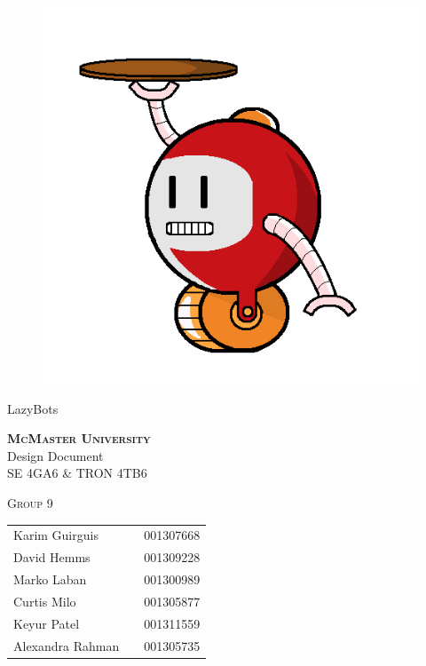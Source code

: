 \documentclass [10pt]{article}
\begin{document}
\begin {center} 

\thispagestyle{empty}
\vspace*{5cm}

\begin {figure}[h!]
\centering
\hspace{-10mm}\includegraphics [scale = .3, trim={.4cm 0 .8cm 0},clip] {figures/alfred.png}
\end {figure}

{%
\Huge{LazyBots} }

\vspace{1 cm}
{\Large\textbf{\textsc{McMaster University}}\\}  \vspace {1cm}
{\Large Design Document \\ \vspace {0.4 cm} SE 4GA6 \& TRON 4TB6}  \vspace {1cm}

{\large \textsc{Group 9} \\} \vspace{1cm}



\begin{tabular}{ l c  l}
Karim Guirguis & & 001307668 \\
David Hemms & & 001309228 \\
Marko Laban & & 001300989 \\
Curtis Milo & & 001305877 \\
Keyur Patel & & 001311559 \\
Alexandra Rahman & & 001305735
\end{tabular}


\end{center}
\end{document}
